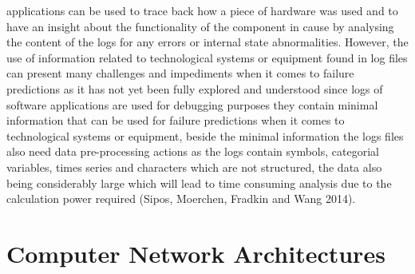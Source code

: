 applications can be used to trace back how a piece of hardware was used and to have an insight about the functionality
of the component in cause by analysing the content of the logs for any errors or internal state abnormalities. However,
the use of information related to technological systems or equipment found in log files can present many challenges and
impediments when it comes to failure predictions as it has not yet been fully explored and understood since logs of
software applications are used for debugging purposes they contain minimal information that can be used for failure
predictions when it  comes to technological systems or equipment, beside the minimal information the logs files also
need data pre-processing actions as the logs contain symbols, categorial variables, times series and characters which
are not structured, the data also being considerably large which will lead to time consuming analysis due to the
calculation power required (Sipos, Moerchen, Fradkin and Wang 2014).

\section{Computer Network Architectures}

